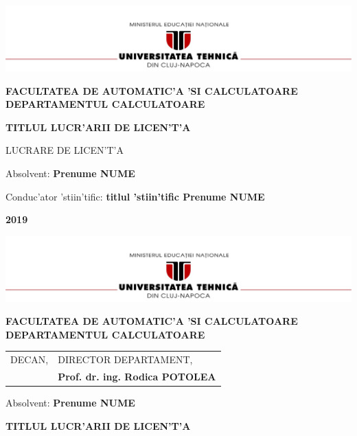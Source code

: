 \documentclass[12pt,a4paper,twoside]{report}
\renewcommand{\thesisauthor}{Prenume NUME}    %
\renewcommand{\thesisyear}{2019}      %
\renewcommand{\thesistitle}{TITLUL LUCR'ARII DE LICEN'T'A} %
\renewcommand{\thesissupervisor}{titlul 'stiin'tific Prenume NUME}
\newcommand{\department}{FACULTATEA DE AUTOMATIC'A 'SI CALCULATOARE\\
DEPARTAMENTUL CALCULATOARE}
\newcommand{\thesis}{LUCRARE DE LICEN'T'A}
\newcommand{\utcnlogo}{\includegraphics[width=15cm]{img/utcn.jpg}}
\begin{document}

\newenvironment{definition}[1][Defini'tie.]{\begin{trivlist}
\item[\hskip \labelsep {\bfseries #1}]}{\end{trivlist}}





\begin{center}
\utcnlogo

{\bf \department}

\vspace{4cm}

{\bf \thesistitle} %

\vspace{1.5cm}

\thesis

\vspace{6cm}

Absolvent: {\bf \thesisauthor} 

Conduc'ator 'stiin'tific: {\bf \thesissupervisor}

\vspace{3cm}
{\bf \thesisyear}
\end{center}

\thispagestyle{empty}
\newpage

\begin{center}
\utcnlogo

{\bf \department}
\end{center}
\vspace{0.5cm}

\begin{tabular}{p{7cm}p{8cm}}
 \hspace{-1cm}DECAN, & DIRECTOR DEPARTAMENT,\\
\hspace{-1cm}{\bf Prof. dr. ing. Liviu MICLEA} & {\bf Prof. dr. ing. Rodica POTOLEA}\\  
\end{tabular}
 
\vspace{2cm}

\begin{center}
Absolvent: {\bf \thesisauthor}

\vspace{1cm}

{\bf \thesistitle}
\end{center}
\end{document}
